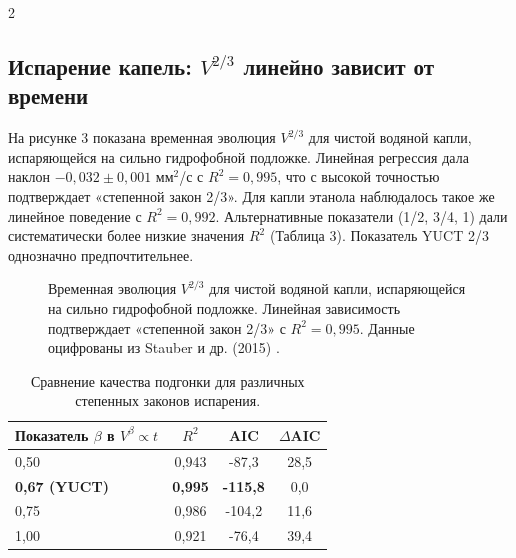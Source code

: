\documentclass[11pt,a4paper]{article}
\begin{document}
\begin{multicols}{2}
		\subsection{Испарение капель: \(V^{2/3}\) линейно зависит от времени}
		
		На рисунке 3 показана временная эволюция \(V^{2/3}\) для чистой водяной капли, испаряющейся на сильно гидрофобной подложке. Линейная регрессия дала наклон \(-0,032 \pm 0,001\) мм\(^2\)/с с \(R^2 = 0,995\), что с высокой точностью подтверждает «степенной закон 2/3». Для капли этанола наблюдалось такое же линейное поведение с \(R^2 = 0,992\). Альтернативные показатели (1/2, 3/4, 1) дали систематически более низкие значения \(R^2\) (Таблица 3). Показатель YUCT 2/3 однозначно предпочтительнее.
		
		\begin{figure}[htbp]
			\centering
			\caption{Временная эволюция \(V^{2/3}\) для чистой водяной капли, испаряющейся на сильно гидрофобной подложке. Линейная зависимость подтверждает «степенной закон 2/3» с \(R^2 = 0,995\). Данные оцифрованы из Stauber и др. (2015) \cite{Stauber2015}.}
			\label{fig:evaporation}
		\end{figure}
		
		\begin{table}[htbp]
			\centering
			\caption{Сравнение качества подгонки для различных степенных законов испарения.}
			\label{tab:evaporation}
			\begin{tabular}{lccc}
				\toprule
				\textbf{Показатель $\beta$ в $V^{\beta} \propto t$} & $R^2$ & AIC & $\Delta$AIC \\
				\midrule
				0,50 & 0,943 & -87,3 & 28,5 \\
				\textbf{0,67 (YUCT)} & \textbf{0,995} & \textbf{-115,8} & 0,0 \\
				0,75 & 0,986 & -104,2 & 11,6 \\
				1,00 & 0,921 & -76,4 & 39,4 \\
				\bottomrule
			\end{tabular}
		\end{table}
		

\end{multicols}
\end{document}
